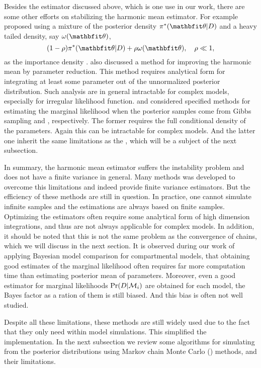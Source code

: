 Besides the estimator discussed above, which is one use in our work, there are
some other efforts on stabilizing the harmonic mean estimator. For example
\textcite{Hesterberg1995} proposed using a mixture of the posterior density
$\pi^*(\bth|D)$ and a heavy tailed density, say $\omega(\bth)$,
\[
  (1-\rho)\pi^*(\bth|D) + \rho\omega(\bth),\quad \rho\ll 1,
\]
as the importance density \parencite[see also][]{Owen2000}.
\textcite{Raftery2006} also discussed a method for improving the harmonic mean
by parameter reduction. This method requires analytical form for integrating
at least some parameter out of the unnormalized posterior distribution. Such
analysis are in general intractable for complex models, especially for
irregular likelihood function. \textcite{Chib1995} and \textcite{Chib2001}
considered specified methods for estimating the marginal likelihood when the
posterior samples come from Gibbs sampling and \mha, respectively. The former
requires the full conditional density of the parameters. Again this can be
intractable for complex models. And the latter one inherit the same
limitations as the \mha, which will be a subject of the next subsection.

In summary, the harmonic mean estimator suffers the instability problem and
does not have a finite variance in general. Many methods was developed to
overcome this limitations and indeed provide finite variance estimators. But
the efficiency of these methods are still in question. In practice, one cannot
simulate infinite samples and the estimations are always based on finite
samples. Optimizing the estimators often require some analytical form of high
dimension integrations, and thus are not always applicable for complex models.
In addition, it should be noted that this is not the same problem as the
convergence of \mcmc chains, which we will discuss in the next section. It is
observed during our work of applying Bayesian model comparison for
compartmental models, that obtaining good estimates of the marginal likelihood
often requires far more computation time than estimating posterior mean of
parameters. Moreover, even a good estimator for marginal likelihoods
$\Pr(D|\mathcal{M}_i)$ are obtained for each model, the Bayes factor as a ration of
them is still biased. And this bias is often not well studied.

Despite all these limitations, these methods are still widely used due to the
fact that they only need within model simulations. This simplified the
implementation. In the next subsection we review some algorithms for
simulating from the posterior distributions using Markov chain Monte Carlo
(\mcmc) methods, and their limitations.


